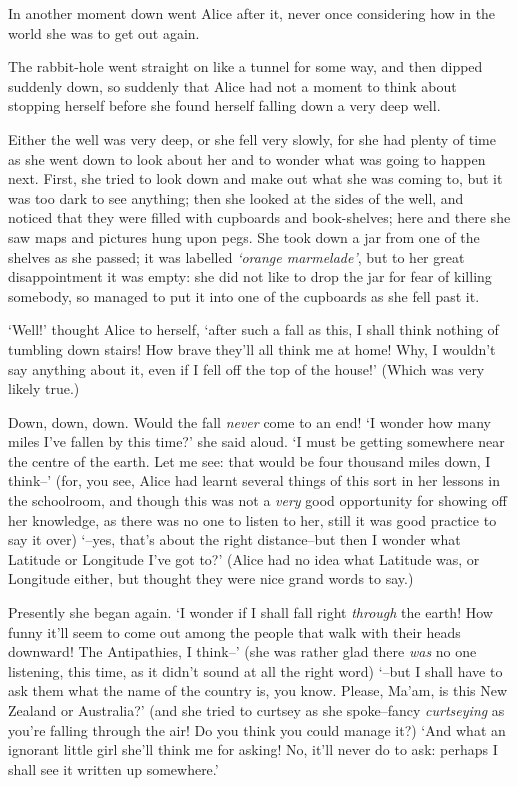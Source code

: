   In another moment down went Alice after it, never once
considering how in the world she was to get out again.

  The rabbit-hole went straight on like a tunnel for some way,
and then dipped suddenly down, so suddenly that Alice had not a
moment to think about stopping herself before she found herself
falling down a very deep well.

  Either the well was very deep, or she fell very slowly, for she
had plenty of time as she went down to look about her and to
wonder what was going to happen next.  First, she tried to look
down and make out what she was coming to, but it was too dark to
see anything; then she looked at the sides of the well, and
noticed that they were filled with cupboards and book-shelves;
here and there she saw maps and pictures hung upon pegs.  She
took down a jar from one of the shelves as she passed; it was
labelled {\it `orange marmelade'}, but to her great disappointment it
was empty:  she did not like to drop the jar for fear of killing
somebody, so managed to put it into one of the cupboards as she
fell past it.

  `Well!' thought Alice to herself, `after such a fall as this, I
shall think nothing of tumbling down stairs!  How brave they'll
all think me at home!  Why, I wouldn't say anything about it,
even if I fell off the top of the house!' (Which was very likely
true.)

  Down, down, down.  Would the fall {\it never} come to an end!  `I
wonder how many miles I've fallen by this time?' she said aloud.
`I must be getting somewhere near the centre of the earth.  Let
me see:  that would be four thousand miles down, I think--' (for,
you see, Alice had learnt several things of this sort in her
lessons in the schoolroom, and though this was not a {\it very} good
opportunity for showing off her knowledge, as there was no one to
listen to her, still it was good practice to say it over) `--yes,
that's about the right distance--but then I wonder what Latitude
or Longitude I've got to?'  (Alice had no idea what Latitude was,
or Longitude either, but thought they were nice grand words to
say.)

  Presently she began again.  `I wonder if I shall fall right
{\it through} the earth!  How funny it'll seem to come out among the
people that walk with their heads downward!  The Antipathies, I
think--' (she was rather glad there {\it was} no one listening, this
time, as it didn't sound at all the right word) `--but I shall
have to ask them what the name of the country is, you know.
Please, Ma'am, is this New Zealand or Australia?' (and she tried
to curtsey as she spoke--fancy {\it curtseying} as you're falling
through the air!  Do you think you could manage it?)  `And what
an ignorant little girl she'll think me for asking!  No, it'll
never do to ask:  perhaps I shall see it written up somewhere.'


